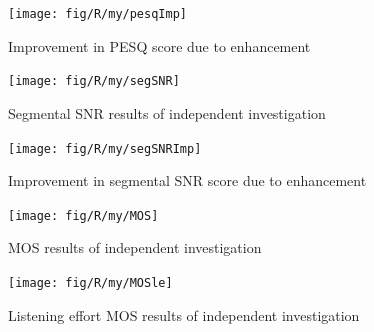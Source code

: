 \begin{figure}[p]
\noindent \begin{centering}
\texttt{[image: fig/R/my/pesqImp]}
\par\end{centering}

\protect\caption{\label{fig:my-PESQ-imp}Improvement in \foreignlanguage{australian}{\acs{PESQ}
score due to enhancement}%
}
\end{figure}


\begin{figure}[h]
\noindent \begin{centering}
\texttt{[image: fig/R/my/segSNR]}
\par\end{centering}

\protect\caption{\label{fig:my-segSNR}Segmental \foreignlanguage{australian}{\acs{SNR}
results of independent investigation}%
}
\end{figure}


\begin{figure}[h]
\noindent \begin{centering}
\texttt{[image: fig/R/my/segSNRImp]}
\par\end{centering}

\protect\caption{\label{fig:my-segSNR-imp}Improvement in segmental \foreignlanguage{australian}{\acs{SNR}
score due to enhancement}%
}
\end{figure}


\begin{figure}[h]
\noindent \begin{centering}
\texttt{[image: fig/R/my/MOS]}
\par\end{centering}

\protect\caption{\label{fig:my-MOS}\foreignlanguage{australian}{\acs{MOS} results
of independent investigation}%
}
\end{figure}


\begin{figure}[h]
\noindent \begin{centering}
\texttt{[image: fig/R/my/MOSle]}
\par\end{centering}

\protect\caption{\label{fig:my-MOSle}Listening effort \foreignlanguage{australian}{\acs{MOS}
results of independent investigation}%
}
\end{figure}


